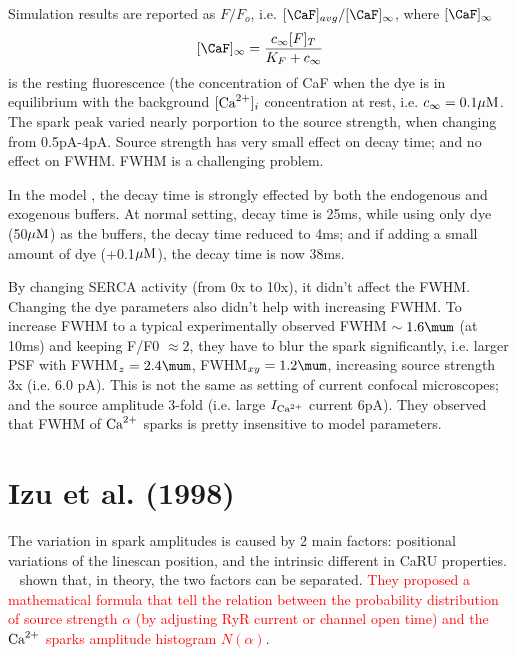 Simulation results are reported as $F/F_o$, i.e. $[\CaF]_{avg}/[\CaF]_\infty$,
where $[\CaF]_\infty$
\begin{equation}
  \label{eq:969}
  [\CaF]_\infty = \frac{c_\infty[F]_T}{K_F+c_\infty}
\end{equation}
is the resting fluorescence (the concentration of CaF when
the dye is in equilibrium with the background $[{\text{Ca}^{2+}}]_i$ concentration at rest,
i.e. $c_\infty = 0.1{\mu\text{M}}$.  The spark peak varied nearly porportion to the
source strength, when changing from 0.5pA-4pA. Source
strength has very small effect on decay time; and no effect on FWHM. FWHM is a
challenging problem.

In the model , the decay time is strongly effected by both the endogenous and
exogenous buffers. At normal setting, decay time is 25ms, while using only dye
(50${\mu\text{M}}$) as the buffers, the decay time reduced to 4ms; and if adding a small
amount of dye (+0.1${\mu\text{M}}$), the decay time is now 38ms.

By changing SERCA activity (from 0x to 10x), it didn't affect the FWHM. Changing
the dye parameters also didn't help with increasing FWHM. To increase FWHM to a
typical experimentally observed FWHM $\sim 1.6\mum$ (at 10ms) and keeping F/F0
$\approx 2$, they have to blur the spark significantly, i.e. larger PSF with
FWHM$_z=2.4\mum$, FWHM$_{xy}=1.2\mum$, increasing source strength 3x (i.e.
6.0 pA). This is not the same as setting of current confocal microscopes; and
the source amplitude 3-fold (i.e.
large $I_{\text{Ca}^{2+}}$ current 6pA). They observed that FWHM of ${\text{Ca}^{2+}}$ sparks is pretty
insensitive to model parameters.


\section{Izu et al. (1998) }
\label{sec:izu-et-al}

The variation in spark amplitudes is caused by 2 main factors:
positional variations of the linescan position, and the intrinsic
different in CaRU properties. ~\citep{izu1998} shown that, in theory,
the two factors can be separated.
\textcolor{red}{They proposed a mathematical formula that tell the
  relation between the probability distribution of source strength
  $\alpha$ (by adjusting RyR current or channel open time) and the
  ${\text{Ca}^{2+}}$ sparks amplitude histogram $N(\alpha)$}.

